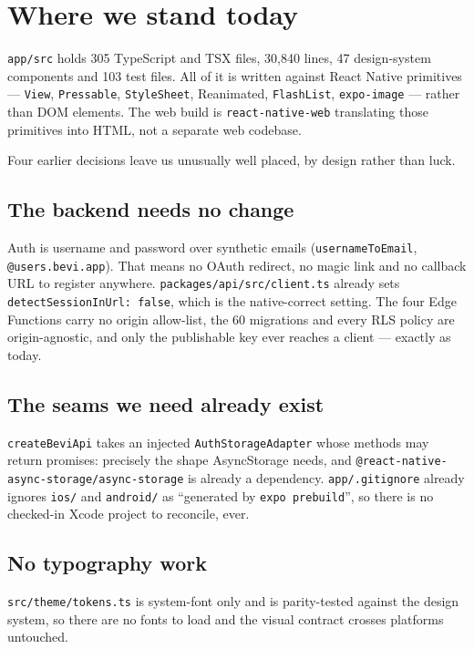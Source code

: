 \documentclass[11pt]{article}
\newcommand{\code}[1]{\texttt{\small #1}}
\newcommand{\bk}{\discretionary{}{}{}}
\begin{document}
\section{Where we stand today}

\code{app/src} holds 305 TypeScript and TSX files, 30{,}840 lines, 47 design-system components and
103 test files. All of it is written against React Native primitives --- \code{View},
\code{Pressable}, \code{StyleSheet}, Reanimated, \code{FlashList}, \code{expo-image} --- rather than
DOM elements. The web build is \code{react-native-web} translating those primitives into HTML, not a
separate web codebase.

Four earlier decisions leave us unusually well placed, by design rather than luck.

\subsection{The backend needs no change}

Auth is username and password over synthetic emails (\code{usernameToEmail},
\code{@users.bevi.app}). That means no OAuth redirect, no magic link and no callback URL to register
anywhere. \code{packages/api/src/client.ts} already sets \code{detectSessionInUrl: false}, which is
the native-correct setting. The four Edge Functions carry no origin allow-list, the 60 migrations and
every RLS policy are origin-agnostic, and only the publishable key ever reaches a client --- exactly
as today.

\subsection{The seams we need already exist}

\code{createBeviApi} takes an injected \code{AuthStorageAdapter} whose methods may return promises:
precisely the shape AsyncStorage needs, and
\code{@react-native-\bk async-storage/\bk async-storage} is already a dependency.
\code{app/.gitignore} already ignores \code{ios/} and \code{android/} as ``generated by
\code{expo prebuild}'', so there is no checked-in Xcode project to reconcile, ever.

\subsection{No typography work}

\code{src/theme/tokens.ts} is system-font only and is parity-tested against the design system, so
there are no fonts to load and the visual contract crosses platforms untouched.
\end{document}
